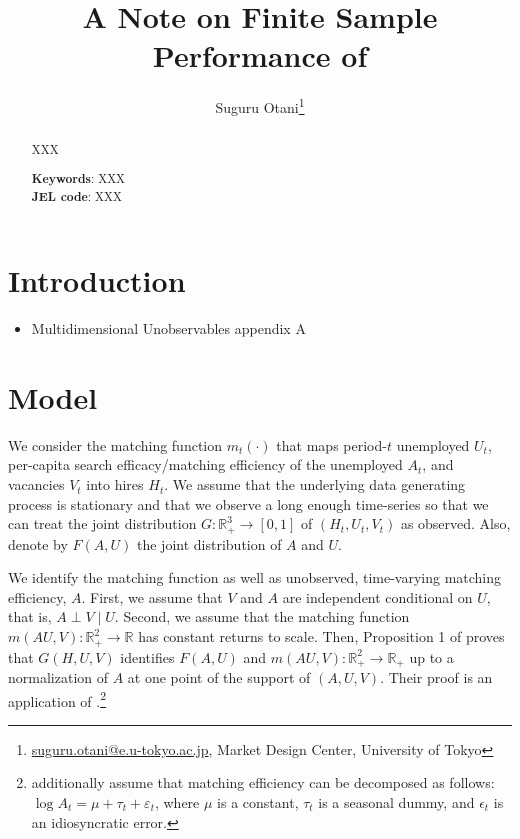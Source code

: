\documentclass[12pt]{article}
\begin{document}
\title{A Note on Finite Sample Performance of \cite{lange2020beyond}}
\author{Suguru Otani\thanks{\href{mailto:}{suguru.otani@e.u-tokyo.ac.jp}, Market Design Center, University of Tokyo}}
\maketitle

\begin{abstract}
\noindent
XXX

\textbf{Keywords}: XXX \\
\textbf{JEL code}: XXX
\end{abstract}

\section{Introduction}

\begin{itemize}
    \item Multidimensional Unobservables \cite{matzkin2003nonparametric} appendix A
\end{itemize}

\section{Model}
We consider the matching function $m_t(\cdot)$ that maps period-$t$ unemployed $U_t$, per-capita search efficacy/matching efficiency of the unemployed $A_t$, and vacancies $V_t$ into hires $H_t$.
We assume that the underlying data generating process is stationary and that we observe a long enough time-series so that we can treat the joint distribution $G: \mathbb{R}_{+}^3 \rightarrow[0,1]$ of $\left(H_t, U_t, V_t\right)$ as observed. 
Also, denote by $F(A, U)$ the joint distribution of $A$ and $U$.

We identify the matching function as well as unobserved, time-varying matching efficiency, $A .$ 
First, we assume that $V$ and $A$ are independent conditional on $U$, that is, $A \perp V \mid U$. 
Second, we assume that the matching function $m(AU,V):\mathbb{R}_{+}^2 \rightarrow \mathbb{R}$ has constant returns to scale. 
Then, Proposition 1 of \cite{lange2020beyond} proves that $G(H, U, V)$ identifies $F(A, U)$ and $m(A U, V): \mathbb{R}_{+}^2 \rightarrow \mathbb{R}_{+}$ up to a normalization of $A$ at one point of the support of $(A, U, V)$. Their proof is an application of \cite{matzkin2003nonparametric}.\footnote{\cite{borowczyk2013accounting} additionally assume that matching efficiency can be decomposed as follows: $\log A_{t}=\mu + \tau_{t} + \varepsilon_{t}$, where $\mu$ is a constant, $\tau_t$ is a seasonal dummy, and $\epsilon_t$ is an idiosyncratic error.}
\end{document}
